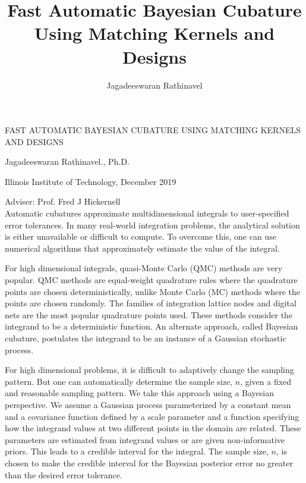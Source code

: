 \documentclass[11pt]{report}
\title{
		Fast Automatic Bayesian Cubature Using 
		Matching Kernels and Designs
	}
\author{Jagadeeswaran Rathinavel}
\begin{document}
	\pagestyle{empty}
\noindent \hspace{-1ex}
\vspace{-2ex}
{\color{black}
	FAST AUTOMATIC BAYESIAN CUBATURE USING MATCHING KERNELS AND DESIGNS
}

\noindent
Jagadeeswaran Rathinavel., Ph.D.

\noindent
Illinois Institute of Technology, December 2019

\noindent
Adviser: Prof. Fred J Hickernell 
\\ %

	
	Automatic cubatures approximate multidimensional integrals to user-specified error tolerances. 
	In many real-world integration problems, the analytical solution is either unavailable or difficult to compute.
	To overcome this, one can use numerical algorithms that approximately estimate the value of the integral. 
	
	For high dimensional integrals, quasi-Monte Carlo (QMC) methods are very popular.
	QMC methods are equal-weight quadrature rules where the quadrature points are chosen deterministically, unlike Monte Carlo (MC) methods where the points are chosen randomly.
	The families of integration lattice nodes and digital nets are the most popular quadrature points used. 
	These methods consider the integrand to be a deterministic function.
	An alternate approach, called Bayesian cubature, postulates the integrand to be an instance of a Gaussian stochastic process.  
	
	For high dimensional problems, it is difficult to adaptively change the sampling pattern. But one can automatically determine the sample size, $n$, given a fixed and reasonable sampling pattern. We take this approach using a Bayesian perspective.
	We assume a Gaussian process parameterized by a constant mean and a covariance function defined by a scale parameter and a function specifying how the integrand values at two different points in the domain are related.
	These parameters are estimated from integrand values or are given non-informative priors. This leads to a credible interval for the integral.  The sample size, $n$, is chosen to make the credible interval for the Bayesian posterior error no greater than the desired error tolerance. 
	
\end{document}
